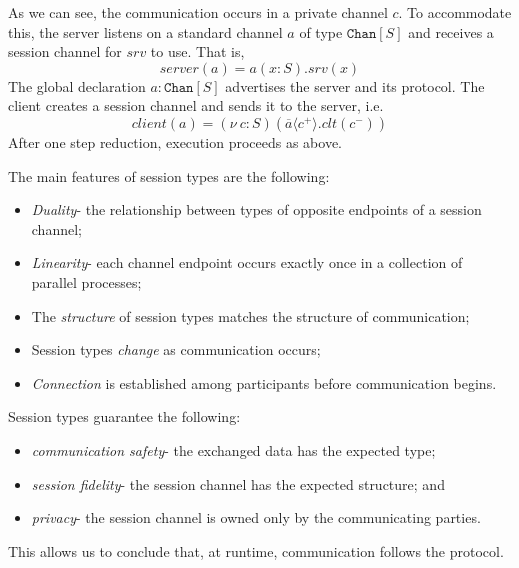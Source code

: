 \documentclass[a4paper, openany]{memoir}
\theoremstyle{definition}
\begin{document}
    As we can see, the communication occurs in a private channel $c$. To accommodate this, the server listens on a standard channel $a$ of type $\texttt{Chan}[S]$ and receives a session channel for $srv$ to use. That is,
    \[\textit{server}(a) = a(x \colon S).srv(x)\]
    The global declaration $a \colon \texttt{Chan}[S]$ advertises the server and its protocol. The client creates a session channel and sends it to the server, i.e.
    \[\textit{client}(a) = (\nu \ c \colon S)(\overline{a}\langle c^+ \rangle.clt(c^-))\]
    After one step reduction, execution proceeds as above.

    The main features of session types are the following:
    \begin{itemize}
        \item \emph{Duality}- the relationship between types of opposite endpoints of a session channel;
        \item \emph{Linearity}- each channel endpoint occurs exactly once in a collection of parallel processes;
        \item The \emph{structure} of session types matches the structure of communication;
        \item Session types \emph{change} as communication occurs;
        \item \emph{Connection} is established among participants before communication begins.
    \end{itemize}
    Session types guarantee the following:
    \begin{itemize}
        \item \emph{communication safety}- the exchanged data has the expected type;
        \item \emph{session fidelity}- the session channel has the expected structure; and
        \item \emph{privacy}- the session channel is owned only by the communicating parties.
    \end{itemize}
    This allows us to conclude that, at runtime, communication follows the protocol.
\end{document}
